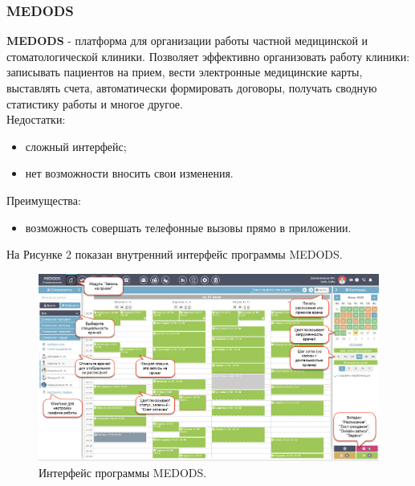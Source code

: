 \documentclass[a4paper, 10pt]{article}
\begin{document}
	\subsubsection{MEDODS}
 	{\bf MEDODS} - платформа для организации работы частной медицинской и стоматологической клиники. Позволяет эффективно организовать работу клиники: записывать пациентов на прием, вести электронные медицинские карты, выставлять счета, автоматически формировать договоры, получать сводную статистику работы и многое другое.
 		\\Недостатки:
 	\begin{itemize}
 		\item сложный интерфейс;
 		\item нет возможности вносить свои изменения.
 	\end{itemize}
 	Преимущества:
 	\begin{itemize}
 		\item возможность совершать телефонные вызовы прямо в приложении.
 	\end{itemize}
 	На Рисунке 2 показан внутренний интерфейс программы MEDODS.
 	\clearpage
 	\newpage
 	\begin{figure}[h!]
 		\centering
 		\includegraphics[scale=0.35]{medods}
 		\centering\caption{Интерфейс программы MEDODS.}
 	\end{figure}
\end{document}
